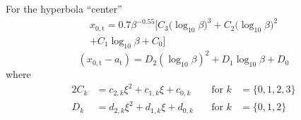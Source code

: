 For the hyperbola ``center''
\begin{multline}
  \label{eq:tail-analytic-x0}
  x_{0,\mathrm{t}} = 0.7 \beta^{-0.55} \biggl[
    C_3 \bigl(\log_{10}\beta\bigr)^3 + C_2 \bigl(\log_{10}\beta\bigr)^2 
  \\ + C_1 \log_{10}\beta + C_0
  \biggr]
\end{multline}
\begin{equation}
  \label{eq:tail-analytic-x0-minus-a}
  (x_{0,\mathrm{t}} - a_{\mathrm{t}}) = D_2 (\log_{10}\beta)^2 + D_1 \log_{10}\beta + D_0
\end{equation}
where
\begin{alignat}{2}
  \label{eq:tail-analytic-coeffs-c}
  C_k &= c_{2,k} \xi^2 + c_{1,k} \xi + c_{0,k} &\quad \text{for\ } k &= \{0, 1, 2, 3\} \\
  \label{eq:tail-analytic-coeffs-d}
  D_k &= d_{2,k} \xi^2 + d_{1,k} \xi + d_{0,k} &\quad \text{for\ } k &= \{0, 1, 2\}
\end{alignat}







